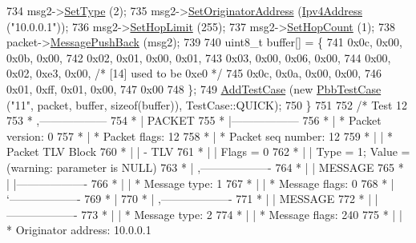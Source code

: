 \begin{DoxyCode}
734     msg2->\hyperlink{classns3_1_1PbbMessage_a4b3d1eaabd3e7412a46ac79bf3360dac}{SetType} (2);
735     msg2->\hyperlink{classns3_1_1PbbMessage_a52ac135a2bec53db5e8f46b8b8a25e7c}{SetOriginatorAddress} (\hyperlink{classns3_1_1Ipv4Address}{Ipv4Address} (\textcolor{stringliteral}{"10.0.0.1"}));
736     msg2->\hyperlink{classns3_1_1PbbMessage_a532a7e5e135f7491f8a84ab1dfadd28f}{SetHopLimit} (255);
737     msg2->\hyperlink{classns3_1_1PbbMessage_a882ec7e2e9a9dff6297152c196d54ce4}{SetHopCount} (1);
738     packet->\hyperlink{classns3_1_1PbbPacket_a4a3170001ef758d9c9c4375b8f089826}{MessagePushBack} (msg2);
739 
740     uint8\_t buffer[] = \{
741       0x0c, 0x00, 0x0b, 0x00,
742       0x02, 0x01, 0x00, 0x01,
743       0x03, 0x00, 0x06, 0x00,
744       0x00, 0x02, 0xe3, 0x00,   \textcolor{comment}{/* [14] used to be 0xe0 */}
745       0x0c, 0x0a, 0x00, 0x00,
746       0x01, 0xff, 0x01, 0x00,
747       0x00
748     \};
749     \hyperlink{classns3_1_1TestCase_a3718088e3eefd5d6454569d2e0ddd835}{AddTestCase} (\textcolor{keyword}{new} \hyperlink{classPbbTestCase}{PbbTestCase} (\textcolor{stringliteral}{"11"}, packet, buffer, \textcolor{keyword}{sizeof}(buffer)), 
      TestCase::QUICK);
750   \}
751 
752   \textcolor{comment}{/* Test 12}
753 \textcolor{comment}{         * ,------------------}
754 \textcolor{comment}{         * |  PACKET}
755 \textcolor{comment}{         * |------------------}
756 \textcolor{comment}{         * | * Packet version:    0}
757 \textcolor{comment}{         * | * Packet flags:  12}
758 \textcolor{comment}{         * | * Packet seq number: 12}
759 \textcolor{comment}{         * |    | * Packet TLV Block}
760 \textcolor{comment}{         * |    |     - TLV}
761 \textcolor{comment}{         * |    |         Flags = 0}
762 \textcolor{comment}{         * |    |         Type = 1; Value = (warning: parameter is NULL)}
763 \textcolor{comment}{         * |    ,-------------------}
764 \textcolor{comment}{         * |    |  MESSAGE}
765 \textcolor{comment}{         * |    |-------------------}
766 \textcolor{comment}{         * |    | * Message type:       1}
767 \textcolor{comment}{         * |    | * Message flags:  0}
768 \textcolor{comment}{         * |    `-------------------}
769 \textcolor{comment}{         * |}
770 \textcolor{comment}{         * |    ,-------------------}
771 \textcolor{comment}{         * |    |  MESSAGE}
772 \textcolor{comment}{         * |    |-------------------}
773 \textcolor{comment}{         * |    | * Message type:       2}
774 \textcolor{comment}{         * |    | * Message flags:  240}
775 \textcolor{comment}{         * |    | * Originator address: 10.0.0.1}

\end{DoxyCode}
